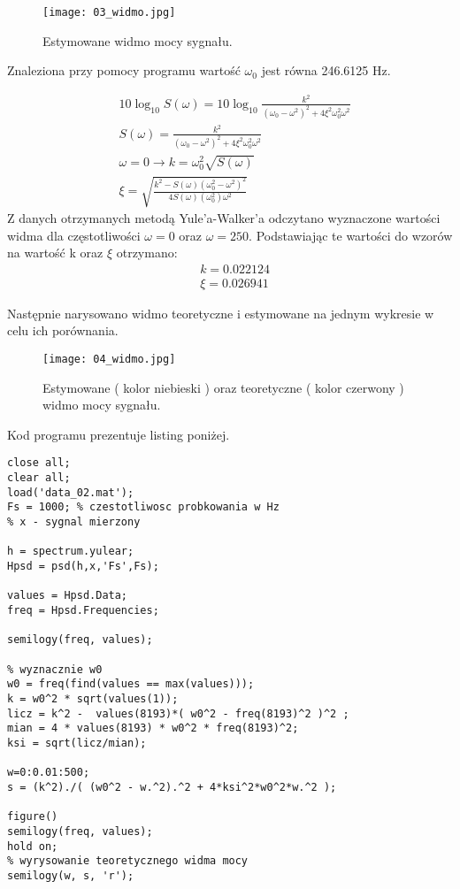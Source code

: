\documentclass[a4paper,15pt]{article}
\begin{document}
\begin{figure}[H]
\centerline{\texttt{[image: 03\_widmo.jpg]}}
\centering
\caption{Estymowane widmo mocy sygnału.}
\label{fig:03_widmo}
\end{figure}

Znaleziona przy pomocy programu wartość \( \omega _0 \) jest równa  246.6125 Hz.


\begin{align*}
& 10\log _{10} S(\omega) = 10 \log _{10} \frac{k^2}{(\omega _0 - \omega ^2 ) ^2 + 4\xi ^2 \omega _0 ^2 \omega ^2} \\
& S(\omega ) = \frac{k^2}{(\omega _0 - \omega ^2 ) ^2 + 4\xi ^2 \omega _0 ^2 \omega ^2} \\
& \omega = 0 \rightarrow k =  \omega _0^2 \sqrt{S(\omega)} \\
& \xi = \sqrt{\frac{k^2 - S(\omega)(\omega _0^2 - \omega^2)^2}{4S(\omega)(\omega _0^2)\omega^2}}
\end{align*}
Z danych otrzymanych metodą Yule’a-Walker’a odczytano wyznaczone wartości widma dla częstotliwości \( \omega = 0 \) oraz \( \omega = 250 \).
Podstawiając te wartości do wzorów na wartość k oraz \( \xi \) otrzymano:
\begin{align*}
& k = 0.022124 \\
& \xi = 0.026941
\end{align*}

Następnie narysowano widmo teoretyczne i estymowane na jednym wykresie w celu ich porównania.
\begin{figure}[H]
\centerline{\texttt{[image: 04\_widmo.jpg]}}
\centering
\caption{Estymowane ( kolor niebieski ) oraz teoretyczne ( kolor czerwony ) widmo mocy sygnału.}
\label{fig:04_widmo}
\end{figure}


Kod programu prezentuje listing poniżej.
\begin{lstlisting}[caption=Zadanie 2, captionpos=b,label=lis1, firstnumber=1,frame=single]
close all;
clear all;
load('data_02.mat');
Fs = 1000; % czestotliwosc probkowania w Hz
% x - sygnal mierzony

h = spectrum.yulear;
Hpsd = psd(h,x,'Fs',Fs);

values = Hpsd.Data;
freq = Hpsd.Frequencies;

semilogy(freq, values);

% wyznacznie w0
w0 = freq(find(values == max(values)));
k = w0^2 * sqrt(values(1));
licz = k^2 -  values(8193)*( w0^2 - freq(8193)^2 )^2 ;
mian = 4 * values(8193) * w0^2 * freq(8193)^2;
ksi = sqrt(licz/mian);

w=0:0.01:500;
s = (k^2)./( (w0^2 - w.^2).^2 + 4*ksi^2*w0^2*w.^2 );

figure()
semilogy(freq, values);
hold on;
% wyrysowanie teoretycznego widma mocy
semilogy(w, s, 'r');




\end{lstlisting}
\end{document}
